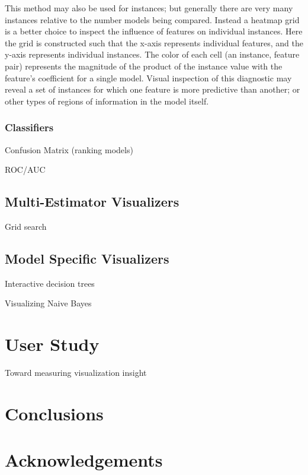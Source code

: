 \documentclass{sigkddExp}
\begin{document}
This method may also be used for instances; but generally there are very many instances relative to the number models being compared. Instead a heatmap grid is a better choice to inspect the influence of features on individual instances. Here the grid is constructed such that the x-axis represents individual features, and the y-axis represents individual instances. The color of each cell (an instance, feature pair) represents the magnitude of the product of the instance value with the feature's coefficient for a single model. Visual inspection of this diagnostic may reveal a set of instances for which one feature is more predictive than another; or other types of regions of information in the model itself.

\subsubsection{Classifiers}

Confusion Matrix (ranking models) \cite{parker_rank_2001}

ROC/AUC \cite{hanley_meaning_1982}

\subsection{Multi-Estimator Visualizers}

Grid search \cite{bergstra_algorithms_2011}

\subsection{Model Specific Visualizers}

Interactive decision trees \cite{ankerst_visual_1999}

Visualizing Naive Bayes \cite{becker_visualizing_2001}

\section{User Study}

Toward measuring visualization insight \cite{north_toward_2006}

\section{Conclusions}

\section{Acknowledgements}




\end{document}
